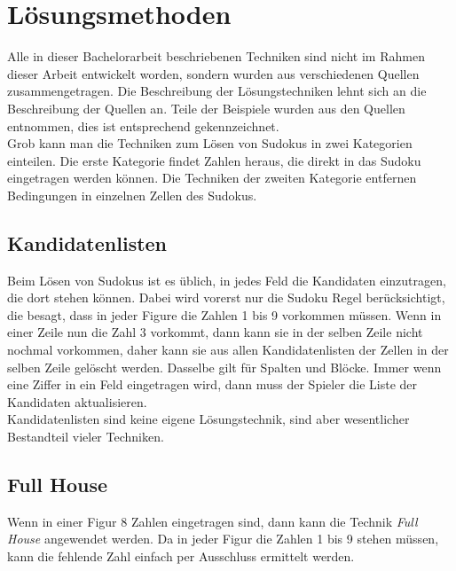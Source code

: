 \documentclass[accentcolor=tud6b,11pt,paper=a4]{tudreport}
\begin{document}
\chapter{Lösungsmethoden}
Alle in dieser Bachelorarbeit beschriebenen Techniken sind nicht im Rahmen dieser Arbeit entwickelt worden, sondern wurden aus verschiedenen Quellen zusammengetragen. Die Beschreibung der Lösungstechniken lehnt sich an die Beschreibung der Quellen an. Teile der Beispiele wurden aus den Quellen entnommen, dies ist entsprechend gekennzeichnet.\\
Grob kann man die Techniken zum Lösen von Sudokus in zwei Kategorien einteilen. Die erste Kategorie findet Zahlen heraus, die direkt in das Sudoku eingetragen werden können. Die Techniken der zweiten Kategorie entfernen Bedingungen in einzelnen Zellen des Sudokus.

\section{Kandidatenlisten}
Beim Lösen von Sudokus ist es üblich, in jedes Feld die Kandidaten einzutragen, die dort stehen können. Dabei wird vorerst nur die Sudoku Regel berücksichtigt, die besagt, dass in jeder Figure die Zahlen 1 bis 9 vorkommen müssen. Wenn in einer Zeile nun die Zahl 3 vorkommt, dann kann sie in der selben Zeile nicht nochmal vorkommen, daher kann sie aus allen Kandidatenlisten der Zellen in der selben Zeile gelöscht werden. Dasselbe gilt für Spalten und Blöcke. Immer wenn eine Ziffer in ein Feld eingetragen wird, dann muss der Spieler die Liste der Kandidaten aktualisieren.\\
Kandidatenlisten sind keine eigene Lösungstechnik, sind aber wesentlicher Bestandteil vieler Techniken.

\newpage
\section{Full House}
Wenn in einer Figur 8 Zahlen eingetragen sind, dann kann die Technik \textit{Full House} angewendet werden. Da in jeder Figur die Zahlen 1 bis 9 stehen müssen, kann die fehlende Zahl einfach per Ausschluss ermittelt werden.\\
\end{document}
